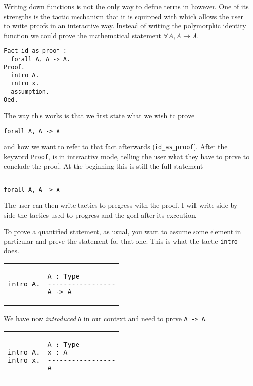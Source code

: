 Writing down functions is not the only way to define terms in \Coq however.
One of its strengths is the tactic mechanism that it is equipped with which
allows the user to write proofs in an interactive way.
Instead of writing the polymorphic identity function we could prove the
mathematical statement \(\forall A, A \to A\).
\begin{verbatim}
Fact id_as_proof :
  forall A, A -> A.
Proof.
  intro A.
  intro x.
  assumption.
Qed.
\end{verbatim}
The way this works is that we first state what we wish to prove
\begin{verbatim}
forall A, A -> A
\end{verbatim}
and how we want to refer to that fact afterwards
(\texttt{id_as_proof}).
After the keyword \texttt{Proof}, \Coq is in interactive mode,
telling the user what they have to prove to conclude the proof.
At the beginning this is still the full statement
\begin{verbatim}
-----------------
forall A, A -> A
\end{verbatim}
The user can then write tactics to progress with the proof.
I will write side by side the tactics used to progress and the goal after its
execution.

To prove a quantified statement, as usual, you want to assume some element in
particular and prove the statement for that one. This is what the tactic
\texttt{intro} does.

\begingroup
\centering
\begin{tabular}{p{}|p{}}
\begin{verbatim}
intro A.
\end{verbatim}
&
\begin{verbatim}
A : Type
-----------------
A -> A
\end{verbatim}
\end{tabular}
\endgroup

We have now \emph{introduced} \texttt{A} in our context and need to
prove \texttt{A -> A}.

\begingroup
\centering
\begin{tabular}{p{}|p{}}
\begin{verbatim}
intro A.
intro x.
\end{verbatim}
&
\begin{verbatim}
A : Type
x : A
-----------------
A
\end{verbatim}
\end{tabular}
\endgroup

